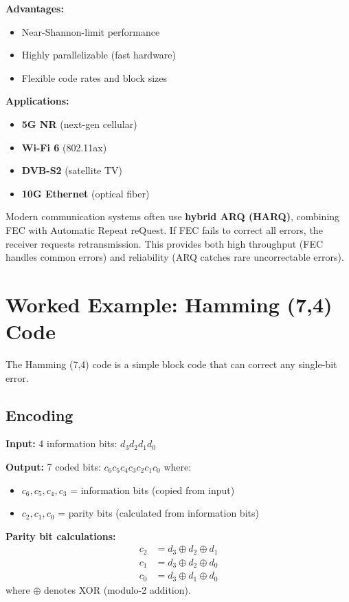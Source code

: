\textbf{Advantages:}
\begin{itemize}
\item Near-Shannon-limit performance
\item Highly parallelizable (fast hardware)
\item Flexible code rates and block sizes
\end{itemize}

\textbf{Applications:}
\begin{itemize}
\item \textbf{5G NR} (next-gen cellular)
\item \textbf{Wi-Fi 6} (802.11ax)
\item \textbf{DVB-S2} (satellite TV)
\item \textbf{10G Ethernet} (optical fiber)
\end{itemize}

\begin{warningbox}
Modern communication systems often use \textbf{hybrid ARQ (HARQ)}, combining FEC with Automatic Repeat reQuest. If FEC fails to correct all errors, the receiver requests retransmission. This provides both high throughput (FEC handles common errors) and reliability (ARQ catches rare uncorrectable errors).
\end{warningbox}

\section{Worked Example: Hamming (7,4) Code}

The Hamming (7,4) code is a simple block code that can correct any single-bit error.

\subsection{Encoding}

\textbf{Input:} 4 information bits: $d_3 d_2 d_1 d_0$

\textbf{Output:} 7 coded bits: $c_6 c_5 c_4 c_3 c_2 c_1 c_0$ where:
\begin{itemize}
\item $c_6, c_5, c_4, c_3$ = information bits (copied from input)
\item $c_2, c_1, c_0$ = parity bits (calculated from information bits)
\end{itemize}

\textbf{Parity bit calculations:}
\begin{align}
c_2 &= d_3 \oplus d_2 \oplus d_1 \label{eq:hamming-p1}\\
c_1 &= d_3 \oplus d_2 \oplus d_0 \label{eq:hamming-p2}\\
c_0 &= d_3 \oplus d_1 \oplus d_0 \label{eq:hamming-p3}
\end{align}
where $\oplus$ denotes XOR (modulo-2 addition).

